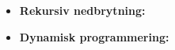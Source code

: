 \begin{itemize}
{    
  }
\item{\textbf{Rekursiv nedbrytning:}

  }
\item{\textbf{Dynamisk programmering:}
    
  }
\end{itemize}
